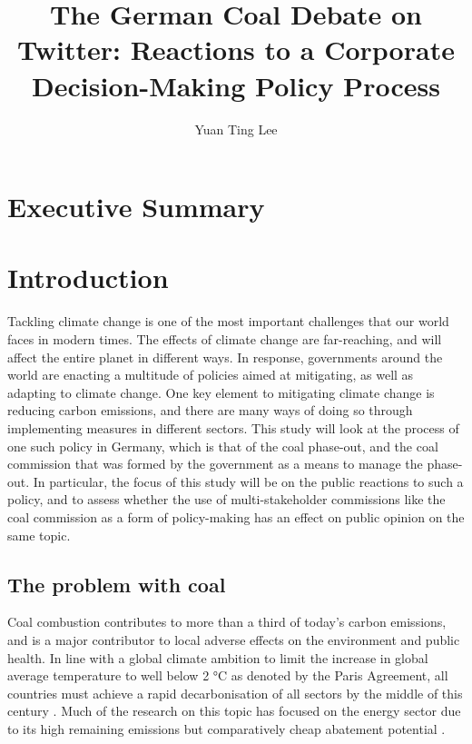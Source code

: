 \documentclass[12pt,onecolumn,twoside]{layout}
\title{The German Coal Debate on Twitter: Reactions to a Corporate Decision-Making Policy Process}
\author[a,b]{Yuan Ting Lee}
\affil[a]{Hertie School, Friedrichstr. 180, Berlin 10117, Germany}
\affil[b]{Mercator Research Institute on Global Commons and Climate Change, Torgauer Str. 12 - 15, Berlin 10829, Germany}
\begin{document}
\onehalfspacing
\maketitle
\thispagestyle{firststyle}

\clearpage
{
	\hypersetup{linkcolor=black}
	\tableofcontents
}

\clearpage
\section{Executive Summary} \label{sec:summary}

\clearpage
\section{Introduction} \label{sec:introduction}
Tackling climate change is one of the most important challenges that our world faces in modern times. The effects of climate change are far-reaching, and will affect the entire planet in different ways. In response, governments around the world are enacting a multitude of policies aimed at mitigating, as well as adapting to climate change. One key element to mitigating climate change is reducing carbon emissions, and there are many ways of doing so through implementing measures in different sectors. This study will look at the process of one such policy in Germany, which is that of the coal phase-out, and the coal commission that was formed by the government as a means to manage the phase-out. In particular, the focus of this study will be on the public reactions to such a policy, and to assess whether the use of multi-stakeholder commissions like the coal commission as a form of policy-making has an effect on public opinion on the same topic.   

\subsection*{The problem with coal}
Coal combustion contributes to more than a third of today's carbon emissions, and is a major contributor to local adverse effects on the environment and public health.  In line with a global climate ambition to limit the increase in global average temperature to well below 2 \si{\degree}C as denoted by the Paris Agreement, all countries must achieve a rapid decarbonisation of all sectors by the middle of this century \citep{Figueres2017}. Much of the research on this topic has focused on the energy sector due to its high remaining emissions but comparatively cheap abatement potential \citep{Armstrong2016}.
\end{document}
